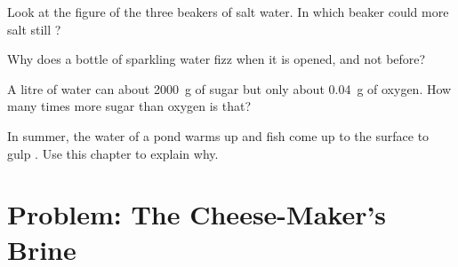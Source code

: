 \begin{exercise}[$\star\star$]\label{exo:g6:solutions-and-solubility:9}
Look at the figure of the three beakers of salt water. In which beaker
could more salt still ?
\end{exercise}

\begin{exercise}[$\star\star$]\label{exo:g6:solutions-and-solubility:10}
Why does a bottle of sparkling water fizz when it is opened, and not
before?
\end{exercise}

\begin{exercise}[$\star\star\star$]\label{exo:g6:solutions-and-solubility:11}
A litre of water can  about \qty{2000}{g} of sugar but only
about \qty{0.04}{g} of oxygen. How many times more sugar than oxygen is
that?
\end{exercise}

\begin{exercise}[$\star\star\star$]\label{exo:g6:solutions-and-solubility:12}
In summer, the water of a pond warms up and fish come up to the surface
to gulp . Use this chapter to explain why.
\end{exercise}

\section{Problem: The Cheese-Maker's Brine}

